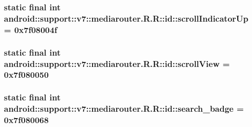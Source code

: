 \hypertarget{classandroid_1_1support_1_1v7_1_1mediarouter_1_1_r_1_1id_f8f88e48af5084cb5e1a118b421c0357}{
\subsubsection[{scrollIndicatorUp}]{\setlength{\rightskip}{0pt plus 5cm}static final int android::support::v7::mediarouter.R.R::id::scrollIndicatorUp = 0x7f08004f}}
\label{classandroid_1_1support_1_1v7_1_1mediarouter_1_1_r_1_1id_f8f88e48af5084cb5e1a118b421c0357}


\hypertarget{classandroid_1_1support_1_1v7_1_1mediarouter_1_1_r_1_1id_9a304e0da789835df305a28c01211e39}{
\subsubsection[{scrollView}]{\setlength{\rightskip}{0pt plus 5cm}static final int android::support::v7::mediarouter.R.R::id::scrollView = 0x7f080050}}
\label{classandroid_1_1support_1_1v7_1_1mediarouter_1_1_r_1_1id_9a304e0da789835df305a28c01211e39}


\hypertarget{classandroid_1_1support_1_1v7_1_1mediarouter_1_1_r_1_1id_eaf4ff14bc84688312968ec161511380}{
\subsubsection[{search\_\-badge}]{\setlength{\rightskip}{0pt plus 5cm}static final int android::support::v7::mediarouter.R.R::id::search\_\-badge = 0x7f080068}}
\label{classandroid_1_1support_1_1v7_1_1mediarouter_1_1_r_1_1id_eaf4ff14bc84688312968ec161511380}


